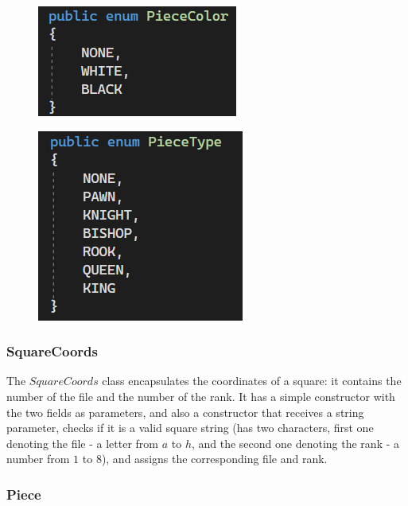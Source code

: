 \begin{figure}[h]
    \centering
    \begin{minipage}{.49\textwidth}
      \centering
      \includegraphics{figures/enum-piece-color.png}
      \label{fig:enumPieceColor}
    \end{minipage}
    \begin{minipage}{.49\textwidth}
      \centering
      \includegraphics{figures/enum-piece-type.png}
      \label{fig:enumPieceType}
    \end{minipage}
\end{figure}

\subsubsection{SquareCoords}
\label{subsubsec:ch5sec1subsec2subsubsec1}

The $SquareCoords$ class encapsulates the coordinates of a square: it contains the number of the file and the number of the rank. It has a simple constructor with the two fields as parameters, and also a constructor that receives a string parameter, checks if it is a valid square string (has two characters, first one denoting the file - a letter from $a$ to $h$, and the second one denoting the rank - a number from $1$ to $8$), and assigns the corresponding file and rank.

\subsubsection{Piece}
\label{subsubsec:ch5sec1subsec2subsubsec2}

